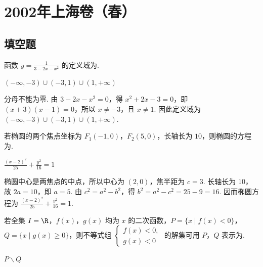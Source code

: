 
\chapter{2002年上海卷（春）}
\section{填空题}
\begin{problem}
函数 \( y = \frac{1}{3 - 2x - x^2} \) 的定义域为\fillinblank{}.
\end{problem}

\begin{answer}
\(\left(-\infty,-3\right)\cup\left(-3,1\right)\cup\left(1,+\infty\right)\)
\end{answer}

\begin{solution}
分母不能为零. 由 \(3-2x-x^2=0\)，得 \(x^2+2x-3=0\)，即 \((x+3)(x-1)=0\)，所以 \(x\ne-3\)，且 \(x\ne1\). 因此定义域为 \(\left(-\infty,-3\right)\cup\left(-3,1\right)\cup\left(1,+\infty\right)\).
\end{solution}

\begin{problem}
若椭圆的两个焦点坐标为 \(F_{1}(-1,0)\)，\(F_{2}(5,0)\)，长轴长为 \(10\)，则椭圆的方程为\fillinblank{}.
\end{problem}

\begin{answer}
\(\frac{(x-2)^2}{25}+\frac{y^2}{16}=1\)
\end{answer}

\begin{solution}
椭圆中心是两焦点的中点，所以中心为 \((2,0)\)，焦半距为 \(c=3\). 长轴长为 \(10\)，故 \(2a=10\)，即 \(a=5\). 由 \(c^2=a^2-b^2\)，得 \(b^2=a^2-c^2=25-9=16\). 因而椭圆方程为 \(\frac{(x-2)^2}{25}+\frac{y^2}{16}=1\).
\end{solution}

\begin{problem}
若全集 \(I = \R\)，\(f(x)\)，\(g(x)\) 均为 \(x\) 的二次函数，\(P = \{x \mid f(x) < 0\}\)，\(Q = \{x \mid g(x) \geqslant 0\}\)，则不等式组 \(\begin{cases}
f(x) < 0,\\
g(x) < 0
\end{cases}\) 的解集可用 \(P\)，\(Q\) 表示为\fillinblank{}.
\end{problem}

\begin{answer}
\(P\mathbin{\backslash}Q\)
\end{answer}

